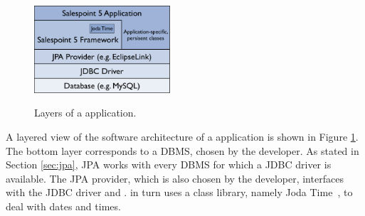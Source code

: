 \begin{figure}[ht]
	\centering
  \includegraphics[width=0.45\textwidth]{images/sp5-layered.pdf}
	\label{sp5-layered}
	\caption{Layers of a \salespoint{} application.}
\end{figure}
A layered view of the software architecture of a \salespoint{} application is shown in Figure \ref{sp5-layered}.
The bottom layer corresponds to a DBMS, chosen by the developer.
As stated in Section \ref{sec:jpa}, JPA works with every DBMS for which a JDBC driver is available.
The JPA provider, which is also chosen by the developer, interfaces with the JDBC driver and \salespoint{}.
\salespoint{} in turn uses a class library, namely Joda Time~\cite{jodatime}, to deal with dates and times.
